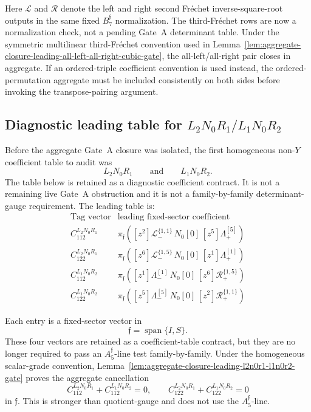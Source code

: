 \documentclass[11pt,a4paper]{amsart}
\theoremstyle{plain}
\theoremstyle{definition}
\begin{document}
Here \(\mathcal L\) and \(\mathcal R\) denote the left and right second
Fr\'echet inverse-square-root outputs in the same fixed
\(B_7^{\mathfrak f}\) normalization.  The third-Fr\'echet rows are now a
normalization check, not a pending Gate~A determinant table.  Under the
symmetric multilinear third-Fr\'echet convention used in
Lemma~\ref{lem:aggregate-closure-leading-all-left-all-right-cubic-gate},
the all-left/all-right pair closes in aggregate.  If an ordered-triple
coefficient convention is used instead, the ordered-permutation aggregate
must be included consistently on both sides before invoking the
transpose-pairing argument.

\subsection{Diagnostic leading table for \(L_2N_0R_1/L_1N_0R_2\)}
\label{app:l2n0r1-leading-table}

Before the aggregate Gate~A closure was isolated, the first homogeneous
non-\(Y\) coefficient table to audit was
\[
L_2N_0R_1
\qquad\text{and}\qquad
L_1N_0R_2.
\]
The table below is retained as a diagnostic coefficient contract.  It is
not a remaining live Gate~A obstruction and it is not a family-by-family
determinant-gauge requirement.
The leading table is:
\[
\begin{array}{c|c}
\text{Tag vector} & \text{leading fixed-sector coefficient}
\\
\hline
C_{112}^{L_2N_0R_1}
&
\pi_{\mathfrak f}
\left(
[z^2]\mathcal L_-^{\{1,1\}}\,
N_0[0]\,
[z^5]\Lambda_+^{[5]}
\right)
\\[1.2ex]
C_{122}^{L_2N_0R_1}
&
\pi_{\mathfrak f}
\left(
[z^6]\mathcal L_-^{\{1,5\}}\,
N_0[0]\,
[z^1]\Lambda_+^{[1]}
\right)
\\[1.2ex]
C_{112}^{L_1N_0R_2}
&
\pi_{\mathfrak f}
\left(
[z^1]\Lambda_-^{[1]}\,
N_0[0]\,
[z^6]\mathcal R_+^{\{1,5\}}
\right)
\\[1.2ex]
C_{122}^{L_1N_0R_2}
&
\pi_{\mathfrak f}
\left(
[z^5]\Lambda_-^{[5]}\,
N_0[0]\,
[z^2]\mathcal R_+^{\{1,1\}}
\right)
\end{array}
\]

Each entry is a fixed-sector vector in
\[
\mathfrak f=\operatorname{span}\{I,S\}.
\]
These four vectors are retained as a coefficient-table contract, but they
are no longer required to pass an \(A_5^{\mathfrak f}\)-line test
family-by-family.  Under the homogeneous scalar-grade convention,
Lemma~\ref{lem:aggregate-closure-leading-l2n0r1-l1n0r2-gate} proves the
aggregate cancellation
\[
C_{112}^{L_2N_0R_1}+C_{112}^{L_1N_0R_2}=0,
\qquad
C_{122}^{L_2N_0R_1}+C_{122}^{L_1N_0R_2}=0
\]
in \(\mathfrak f\).  This is stronger than quotient-gauge and does not use
the \(A_5^{\mathfrak f}\)-line.
\end{document}

